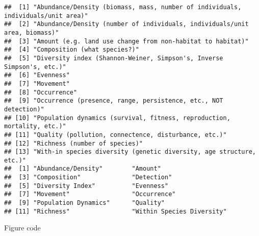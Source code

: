 \documentclass[
]{article}
\begin{document}
\begin{verbatim}
##  [1] "Abundance/Density (biomass, mass, number of individuals, individuals/unit area)"
##  [2] "Abundance/Density (number of individuals, individuals/unit area, biomass)"      
##  [3] "Amount (e.g. land use change from non-habitat to habitat)"                      
##  [4] "Composition (what species?)"                                                    
##  [5] "Diversity index (Shannon-Weiner, Simpson's, Inverse Simpson's, etc.)"           
##  [6] "Evenness"                                                                       
##  [7] "Movement"                                                                       
##  [8] "Occurrence"                                                                     
##  [9] "Occurrence (presence, range, persistence, etc., NOT detection)"                 
## [10] "Population dynamics (survival, fitness, reproduction, mortality, etc.)"         
## [11] "Quality (pollution, connectence, disturbance, etc.)"                            
## [12] "Richness (number of species)"                                                   
## [13] "With-in species diversity (genetic diversity, age structure, etc.)"             
##  [1] "Abundance/Density"        "Amount"                  
##  [3] "Composition"              "Detection"               
##  [5] "Diversity Index"          "Evenness"                
##  [7] "Movement"                 "Occurrence"              
##  [9] "Population Dynamics"      "Quality"                 
## [11] "Richness"                 "Within Species Diversity"
\end{verbatim}

Figure code
\end{document}
